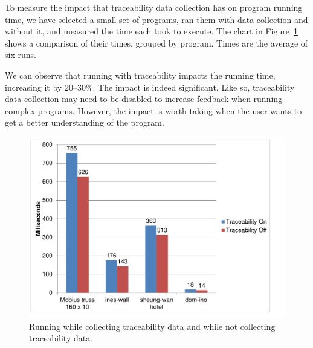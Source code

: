 To measure the impact that traceability data collection has on program running time, we have selected a small set of programs, ran them with data collection and without it, and measured the time each took to execute.
The chart in Figure~\ref{fig:traceability:timing} shows a comparison of their times, grouped by program.
Times are the average of six runs.

We can observe that running with traceability impacts the running time, increasing it by 20--30\%.
The impact is indeed significant.
Like so, traceability data collection may need to be disabled to increase feedback when running complex programs.
However, the impact is worth taking when the user wants to get a better understanding of the program.

\begin{figure}
  \centering
  \includegraphics[width=12cm]{./images/traceability_timing}
  \caption{Running while collecting traceability data and while not collecting traceability data.}
  \label{fig:traceability:timing}
\end{figure}






